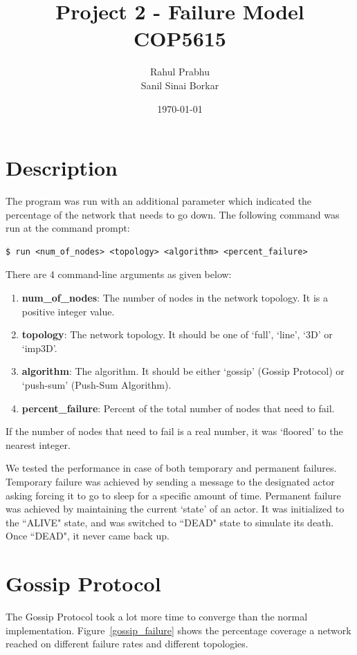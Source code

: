 \documentclass[11pt]{article}
\title{\textbf{Project 2 - Failure Model\\ COP5615}}
\author{Rahul Prabhu\\
		Sanil Sinai Borkar}
\date{\today}
\begin{document}
\maketitle

\section{Description}
The program was run with an additional parameter which indicated the percentage of the network that needs to go down. The following command was run at the command prompt:
\begin{lstlisting}
$ run <num_of_nodes> <topology> <algorithm> <percent_failure>
\end{lstlisting}


There are 4 command-line arguments as given below:
\begin{enumerate}
\item \textbf{num\_of\_nodes}: The number of nodes in the network topology. It is a positive integer value.
\item \textbf{topology}: The network topology. It should be one of `full', `line', `3D' or `imp3D'.
\item \textbf{algorithm}: The algorithm. It should be either `gossip' (Gossip Protocol) or `push-sum' (Push-Sum Algorithm).
\item \textbf{percent\_failure}: Percent of the total number of nodes that need to fail.
\end{enumerate}

If the number of nodes that need to fail is a real number, it was `floored' to the nearest integer.

We tested the performance in case of both temporary and permanent failures. Temporary failure was achieved by sending a message to the designated actor asking forcing it to go to sleep for a specific amount of time. Permanent failure was achieved by maintaining the current `state' of an actor. It was initialized to the ``ALIVE" state, and was switched to ``DEAD" state to simulate its death. Once ``DEAD", it never came back up.

\section{Gossip Protocol}
The Gossip Protocol took a lot more time to converge than the normal implementation. Figure~\ref{gossip_failure} shows the percentage coverage a network reached on different failure rates and different topologies.
\end{document}
